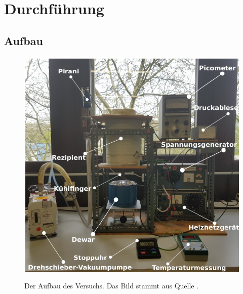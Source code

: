 \section{Durchführung}
\label{sec:Durchführung}
\subsection{Aufbau}

\begin{figure}
    \centering
    \caption{Der Aufbau des Versuchs. Das Bild stammt aus Quelle \cite{anleitung}.}
    \includegraphics[width=\textwidth]{content/data/Aufbau.png}
    \label{fig:aufbau}
\end{figure}

